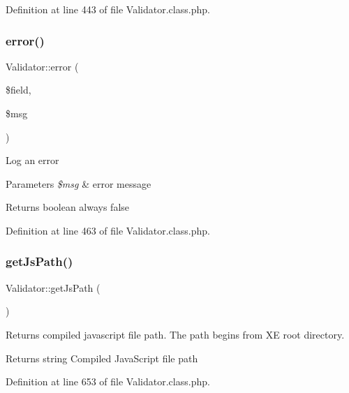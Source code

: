 Definition at line 443 of file Validator.\+class.\+php.

\mbox{\label{classValidator_ad46fa003b320d64ef656b22de870782c}} 
\subsubsection{\texorpdfstring{error()}{error()}}
{\footnotesize\ttfamily Validator\+::error (\begin{DoxyParamCaption}\item[{}]{\$field,  }\item[{}]{\$msg }\end{DoxyParamCaption})}

Log an error 
\begin{DoxyParams}{Parameters}
{\em \$msg} & error message \\
\hline
\end{DoxyParams}
\begin{DoxyReturn}{Returns}
boolean always false 
\end{DoxyReturn}


Definition at line 463 of file Validator.\+class.\+php.

\mbox{\label{classValidator_ae9037d1911390583a1358b25c03768e3}} 
\subsubsection{\texorpdfstring{get\+Js\+Path()}{getJsPath()}}
{\footnotesize\ttfamily Validator\+::get\+Js\+Path (\begin{DoxyParamCaption}{ }\end{DoxyParamCaption})}

Returns compiled javascript file path. The path begins from XE root directory. \begin{DoxyReturn}{Returns}
string Compiled Java\+Script file path 
\end{DoxyReturn}


Definition at line 653 of file Validator.\+class.\+php.

\mbox{\label{classValidator_a3de1a1112e46b42ab6a89a4a13048504}} 
